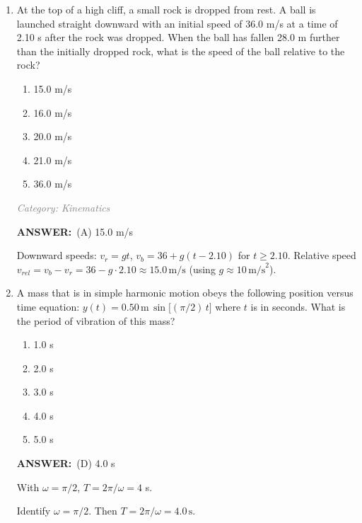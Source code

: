﻿\documentclass[12pt, a4paper]{article}
\makeatletter
\newcommand{\finalanswer}[1]{\textbf{ANSWER:}~#1}
\newif\if@categoryprinted
\newcommand{\category}[1]{\if@categoryprinted\relax\else\textit{\textcolor{gray}{Category: #1}}\global\@categoryprintedtrue\fi}
\newcommand{\tags}[1]{}
\makeatother
\begin{document}
\begin{CJK*}{UTF8}{gbsn}
\begin{enumerate}[itemsep=1.0em, topsep=0.6em]
\item \label{prob:30}
At the top of a high cliff, a small rock is dropped from rest. A ball is launched straight downward with an initial speed of 36.0 m/s at a time of 2.10 s after the rock was dropped. When the ball has fallen 28.0 m further than the initially dropped rock, what is the speed of the ball relative to the rock?
\begin{enumerate}[label=(\Alph*)]
    \item 15.0 m/s
    \item 16.0 m/s
    \item 20.0 m/s
    \item 21.0 m/s
    \item 36.0 m/s
\end{enumerate}

\category{Kinematics}
\begin{answerbox}
\finalanswer{(A) 15.0 m/s}
\end{answerbox}
\begin{solutionbox}

Downward speeds: $v_r=gt$, $v_b=36+g(t-2.10)$ for $t\ge2.10$. Relative speed $v_{rel}=v_b-v_r=36-g\cdot2.10\approx15.0\,\text{m/s}$ (using $g\approx10\,\text{m/s}^2$).
\end{solutionbox}

\newpage

\item \label{prob:31}
A mass that is in simple harmonic motion obeys the following position versus time equation: $y(t)=0.50\,\mathrm{m}\,\sin\big[(\pi/2)\,t\big]$ where $t$ is in seconds. What is the period of vibration of this mass?
\begin{enumerate}[label=(\Alph*)]
    \item 1.0 s
    \item 2.0 s
    \item 3.0 s
    \item 4.0 s
    \item 5.0 s
\end{enumerate}

\category{Oscillations} \tags{}
\begin{answerbox}
\finalanswer{(D) 4.0 s}
\end{answerbox}
\begin{insightbox}
With $\omega=\pi/2$, $T=2\pi/\omega=4$ s.
\end{insightbox}
\begin{solutionbox}

Identify $\omega=\pi/2$. Then $T=2\pi/\omega=4.0\,\text{s}$.
\end{solutionbox}


\end{enumerate}
\end{CJK*}
\end{document}
